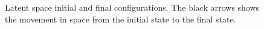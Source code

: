 \documentclass[
	11pt, %
]{beamer}
\begin{document}
\begin{frame}
\begin{figure}[H]
\begin{minipage}[b]{0.5\linewidth}
    \vspace{4ex}
  \end{minipage}  
\caption{Latent space initial and final configurations. The black arrows shows the movement in space from the initial state to the final state.}
\label{fig:latentspace_cluster}
\end{figure}
\end{frame}


%
\end{document}
